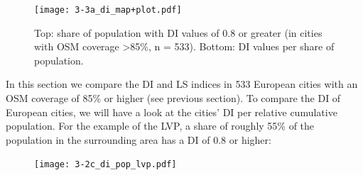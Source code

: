 \documentclass[10pt]{article}
\begin{document}
\begin{figure}
\centering
\texttt{[image: 3-3a\_di\_map+plot.pdf]}
\caption{Top: share of population with DI values of 0.8 or greater (in cities with OSM coverage \textgreater 85\%, n = 533). Bottom: DI values per share of population.}
\label{fig:dimap}
\end{figure}


In this section we compare the DI and LS indices in 533 European cities with an OSM coverage of 85\% or higher (see previous section).
To compare the DI of European cities, we will have a look at the cities’ DI per relative cumulative population.
For the example of the LVP, a share of roughly 55\% of the population in the surrounding area has a DI of 0.8 or higher:
\begin{figure}[H]
\centering
\texttt{[image: 3-2c\_di\_pop\_lvp.pdf]}
\end{figure}
\end{document}
